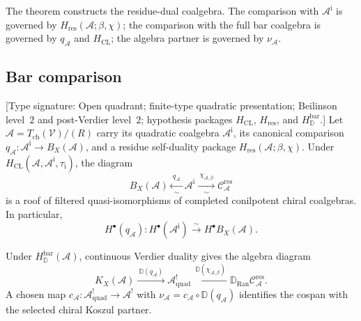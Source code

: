 \begin{remark}
The theorem constructs the residue-dual coalgebra.  The comparison
with $\mathcal A^{\mathrm i}$ is governed by
$H_{\mathrm{res}}(\mathcal A;\beta,\chi)$; the comparison with the
full bar coalgebra is governed by $q_{\mathcal A}$ and
$H_{\mathrm{CL}}$; the algebra partner is governed by
$\nu_{\mathcal A}$.
\end{remark}


\subsection{Bar comparison}

\begin{theorem}
\label{thm:bar-computes-koszul-dual-complete}
\label{thm:chiral-koszul-duality}
\textup{[Type signature: Open quadrant; finite-type quadratic
presentation; Beilinson level~$2$ and post-Verdier level~$2$;
hypothesis packages
$H_{\mathrm{CL}}$, $H_{\mathrm{res}}$, and
$H_{\mathbb D}^{\mathrm{bar}}$.]}
Let $\mathcal A=T_{\mathrm{ch}}(\mathcal V)/(R)$ carry its quadratic
coalgebra $\mathcal A^{\mathrm i}$, its canonical comparison
$q_{\mathcal A}\colon\mathcal A^{\mathrm i}\to B_X(\mathcal A)$,
and a residue self-duality package
$H_{\mathrm{res}}(\mathcal A;\beta,\chi)$.  Under
$H_{\mathrm{CL}}(\mathcal A,\mathcal A^{\mathrm i},
\tau_{\mathrm i})$, the diagram
\begin{equation}
\label{eq:bar-quadratic-residue-roof}
 B_X(\mathcal A)
 \xleftarrow[\sim]{\ q_{\mathcal A}\ }
 \mathcal A^{\mathrm i}
 \xrightarrow[\sim]{\ \chi_{\mathcal A,\beta}\ }
 \mathcal C_{\mathcal A}^{\mathrm{res}}
\end{equation}
is a roof of filtered quasi-isomorphisms of completed conilpotent
chiral coalgebras.  In particular,
\[
 H^\bullet(q_{\mathcal A})\colon
 H^\bullet(\mathcal A^{\mathrm i})
 \xrightarrow{\sim}H^\bullet B_X(\mathcal A).
\]

Under $H_{\mathbb D}^{\mathrm{bar}}(\mathcal A)$, continuous Verdier
duality gives the algebra diagram
\begin{equation}
\label{eq:verdier-quadratic-residue-cospan}
 K_X(\mathcal A)
 \xrightarrow{\ \mathbb D(q_{\mathcal A})\ }
 \mathcal A^!_{\mathrm{quad}}
 \xleftarrow{\ \mathbb D(\chi_{\mathcal A,\beta})\ }
 \mathbb D_{\operatorname{Ran}}
 \mathcal C_{\mathcal A}^{\mathrm{res}}.
\end{equation}
A chosen map
$c_{\mathcal A}\colon\mathcal A^!_{\mathrm{quad}}\to\mathcal A^!$
with
$\nu_{\mathcal A}=c_{\mathcal A}\circ\mathbb D(q_{\mathcal A})$
identifies the cospan with the selected chiral Koszul partner.
\end{theorem}

